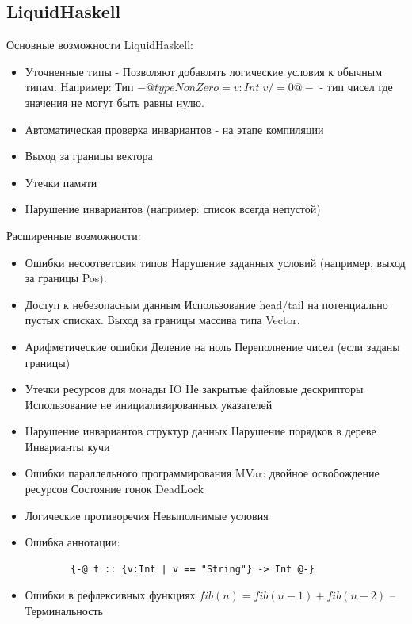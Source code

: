 \documentclass[areasetadvanced]{scrartcl}
\begin{document}
\subsection{LiquidHaskell}
Основные возможности LiquidHaskell:
\begin{itemize}
    \item Уточненные типы - Позволяют добавлять логические условия к обычным типам.
    \subitem Например: Тип ${-@ type NonZero = {v:Int | v /= 0} @-}$ - тип чисел где значения не могут быть равны нулю.
    \item Автоматическая проверка инвариантов - на этапе компиляции 
    \item Выход за границы вектора
    \item Утечки памяти
    \item Нарушение инвариантов (например: список всегда непустой)
\end{itemize}
Расширенные возможности: 
\begin{itemize}
    \item Ошибки несоответсвия типов
    \subitem Нарушение заданных условий (например, выход за границы Pos).
    \item Доступ к небезопасным данным
    \subitem Использование head/tail на потенциально пустых списках.
    \subitem Выход за границы массива типа Vector.
    \item Арифметические ошибки
    \subitem Деление на ноль
    \subitem Переполнение чисел (если заданы границы)
    \item Утечки ресурсов для монады IO
    \subitem Не закрытые файловые дескрипторы 
    \subitem Использование не инициализированных указателей
    \item Нарушение инвариантов структур данных
    \subitem Нарушение порядков в дереве 
    \subitem Инварианты кучи 
    \item Ошибки параллельного программирования
    \subitem MVar: двойное освобождение ресурсов 
    \subitem Состояние гонок
    \subitem DeadLock
    \item Логические противоречия 
    \subitem Невыполнимые условия
    \item Ошибка аннотации:
    \subitem    
    \begin{verbatim}
        {-@ f :: {v:Int | v == "String"} -> Int @-}
        \end{verbatim}
    \item Ошибки в рефлексивных функциях 
    \subitem $fib(n) = fib (n-1) + fib(n-2)$ -- Терминальность
\end{itemize}
\end{document}

